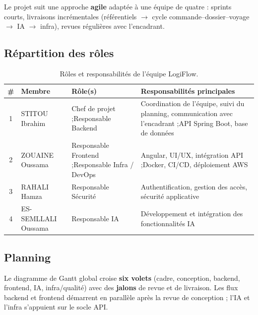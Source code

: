 Le projet suit une approche \textbf{agile} adaptée à une équipe de quatre : sprints courts, livraisons incrémentales (référentiels $\rightarrow$ cycle commande--dossier--voyage $\rightarrow$ IA $\rightarrow$ infra), revues régulières avec l'encadrant.

\subsection{Répartition des rôles}

\begin{table}[H]
\centering
\caption{Rôles et responsabilités de l'équipe LogiFlow.}
\label{tab:repartition}
\small
\begin{tabular}{@{}clp{3.4cm}p{5.6cm}@{}}
\toprule
\# & Membre & Rôle(s) & Responsabilités principales \\
\midrule
1 & STITOU Ibrahim
  & Chef de projet ;\newline Responsable Backend
  & Coordination de l'équipe, suivi du planning, communication avec l'encadrant ;\newline API Spring Boot, base de données \\[0.65em]
2 & ZOUAINE Oussama
  & Responsable Frontend ;\newline Responsable Infra / DevOps
  & Angular, UI/UX, intégration API ;\newline Docker, CI/CD, déploiement AWS \\[0.65em]
3 & RAHALI Hamza
  & Responsable Sécurité
  & Authentification, gestion des accès, sécurité applicative \\[0.65em]
4 & ES-SEMLLALI Oussama
  & Responsable IA
  & Développement et intégration des fonctionnalités IA \\
\bottomrule
\end{tabular}
\end{table}

\subsection{Planning}

Le diagramme de Gantt global croise \textbf{six volets} (cadre, conception, backend, frontend, IA, infra/qualité) avec des \textbf{jalons} de revue et de livraison. Les flux backend et frontend démarrent en parallèle après la revue de conception ; l'IA et l'infra s'appuient sur le socle API.


